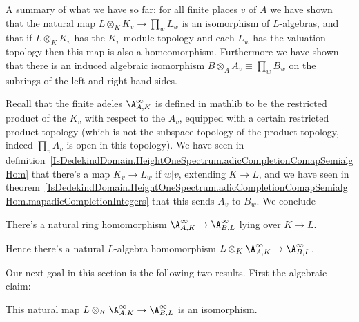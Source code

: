 A summary of what we have so far: for all finite places $v$ of $A$
we have shown that the natural map $L\otimes_KK_v\to\prod_wL_w$
is an isomorphism of $L$-algebras, and that if $L\otimes_KK_v$ has
the $K_v$-module topology and each $L_w$ has the valuation topology
then this map is also a homeomorphism. Furthermore we have shown
that there is an induced algebraic isomorphism $B\otimes_AA_v\equiv\prod_w B_w$
on the subrings of the left and right hand sides.

Recall that the finite adeles $\A_{A,K}^\infty$ is defined in mathlib to be
the restricted product of the $K_v$ with respect to the $A_v$, equipped with a certain
restricted product topology (which is not the subspace topology of the product
topology, indeed $\prod_v A_v$ is open in this topology). We have seen in
definition~\ref{IsDedekindDomain.HeightOneSpectrum.adicCompletionComapSemialgHom} that
there's a map $K_v\to L_w$ if $w|v$, extending $K\to L$, and we have seen in
theorem~\ref{IsDedekindDomain.HeightOneSpectrum.adicCompletionComapSemialgHom.mapadicCompletionIntegers}
that this sends $A_v$ to $B_w$. We conclude

\begin{definition}
  \label{IsDedekindDomain.FiniteAdeleRing.mapSemialgHom}
  \leanok
  There's a natural ring homomorphism
  $\A_{A,K}^\infty\to\A_{B,L}^\infty$ lying over $K\to L$.
\end{definition}

Hence there's a natural $L$-algebra homomorphism $L\otimes_K\A_{A,K}^\infty\to\A_{B,L}^\infty$.

Our next goal in this section is the following two results. First the algebraic claim:

\begin{theorem}
  \label{IsDedekindDomain.FiniteAdeleRing.baseChangeAlgEquiv}
  \leanok
  This natural map $L\otimes_K\A_{A,K}^\infty\to\A_{B,L}^\infty$ is an isomorphism.
\end{theorem}

